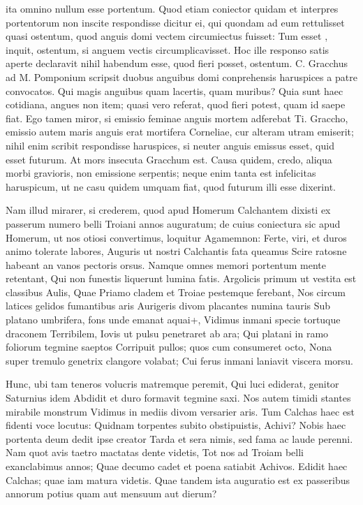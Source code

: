  ita omnino nullum esse portentum. Quod etiam coniector quidam et interpres portentorum non inscite respondisse dicitur ei, qui quondam ad eum rettulisset quasi ostentum, quod anguis domi vectem circumiectus fuisset: Tum esset , inquit, ostentum, si anguem vectis circumplicavisset. Hoc ille responso satis aperte declaravit nihil habendum esse, quod fieri posset, ostentum. C. Gracchus ad M. Pomponium scripsit duobus anguibus domi conprehensis haruspices a patre convocatos. Qui magis anguibus quam lacertis, quam muribus? Quia sunt haec cotidiana, angues non item; quasi vero referat, quod fieri potest, quam id saepe fiat. Ego tamen miror, si emissio feminae anguis mortem adferebat Ti. Graccho, emissio autem maris anguis erat mortifera Corneliae, cur alteram utram emiserit; nihil enim scribit respondisse haruspices, si neuter anguis emissus esset, quid esset futurum. At mors insecuta Gracchum est. Causa quidem, credo, aliqua morbi gravioris, non emissione serpentis; neque enim tanta est infelicitas haruspicum, ut ne casu quidem umquam fiat, quod futurum illi esse dixerint.

 Nam illud mirarer, si crederem, quod apud Homerum Calchantem dixisti ex passerum numero belli Troiani annos auguratum; de cuius coniectura sic apud Homerum, ut nos otiosi convertimus, loquitur Agamemnon: Ferte, viri, et duros animo tolerate labores, Auguris ut nostri Calchantis fata queamus Scire ratosne habeant an vanos pectoris orsus. Namque omnes memori portentum mente retentant, Qui non funestis liquerunt lumina fatis. Argolicis primum ut vestita est classibus Aulis, Quae Priamo cladem et Troiae pestemque ferebant, Nos circum latices gelidos fumantibus aris Aurigeris divom placantes numina tauris Sub platano umbrifera, fons unde emanat aquai+, Vidimus inmani specie tortuque draconem Terribilem, Iovis ut pulsu penetraret ab ara; Qui platani in ramo foliorum tegmine saeptos Corripuit pullos; quos cum consumeret octo, Nona super tremulo genetrix clangore volabat; Cui ferus inmani laniavit viscera morsu.

 Hunc, ubi tam teneros volucris matremque peremit, Qui luci ediderat, genitor Saturnius idem Abdidit et duro formavit tegmine saxi. Nos autem timidi stantes mirabile monstrum Vidimus in mediis divom versarier aris. Tum Calchas haec est fidenti voce locutus: Quidnam torpentes subito obstipuistis, Achivi? Nobis haec portenta deum dedit ipse creator Tarda et sera nimis, sed fama ac laude perenni. Nam quot avis taetro mactatas dente videtis, Tot nos ad Troiam belli exanclabimus annos; Quae decumo cadet et poena satiabit Achivos. Edidit haec Calchas; quae iam matura videtis. Quae tandem ista auguratio est ex passeribus annorum potius quam aut mensuum aut dierum?

